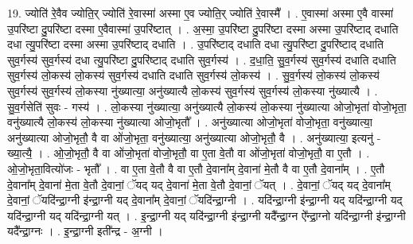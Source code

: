 \documentclass[17pt]{extarticle}
\begin{document}
19. ज्योति॑ रे॒वैव ज्योति॒र् ज्योति॑ रे॒वास्मा॑ अस्मा ए॒व ज्योति॒र् ज्योति॑ रे॒वास्मै᳚ । . ए॒वास्मा॑ अस्मा ए॒वै वास्मा॑ उ॒परि॑ष्टा दु॒परि॑ष्टा दस्मा ए॒वैवास्मा॑ उ॒परि॑ष्टात् । . अ॒स्मा॒ उ॒परि॑ष्टा दु॒परि॑ष्टा दस्मा अस्मा उ॒परि॑ष्टाद् दधाति दधा त्यु॒परि॑ष्टा दस्मा अस्मा उ॒परि॑ष्टाद् दधाति । . उ॒परि॑ष्टाद् दधाति दधा त्यु॒परि॑ष्टा दु॒परि॑ष्टाद् दधाति सुव॒र्गस्य॑ सुव॒र्गस्य॑ दधा त्यु॒परि॑ष्टा दु॒परि॑ष्टाद् दधाति सुव॒र्गस्य॑ । . द॒धा॒ति॒ सु॒व॒र्गस्य॑ सुव॒र्गस्य॑ दधाति दधाति सुव॒र्गस्य॑ लो॒कस्य॑ लो॒कस्य॑ सुव॒र्गस्य॑ दधाति दधाति सुव॒र्गस्य॑ लो॒कस्य॑ । . सु॒व॒र्गस्य॑ लो॒कस्य॑ लो॒कस्य॑ सुव॒र्गस्य॑ सुव॒र्गस्य॑ लो॒कस्या नु॑ख्यात्या॒ अनु॑ख्यात्यै लो॒कस्य॑ सुव॒र्गस्य॑ सुव॒र्गस्य॑ लो॒कस्या नु॑ख्यात्यै । . सु॒व॒र्गसेति॑ सुवः - गस्य॑ । . लो॒कस्या नु॑ख्यात्या॒ अनु॑ख्यात्यै लो॒कस्य॑ लो॒कस्या नु॑ख्यात्या ओजो॒भृता॑ वोजो॒भृता॒ वनु॑ख्यात्यै लो॒कस्य॑ लो॒कस्या नु॑ख्यात्या ओजो॒भृतौ᳚ । . अनु॑ख्यात्या ओजो॒भृता॑ वोजो॒भृता॒ वनु॑ख्यात्या॒ अनु॑ख्यात्या ओजो॒भृतौ॒ वै वा ओ॑जो॒भृता॒ वनु॑ख्यात्या॒ अनु॑ख्यात्या ओजो॒भृतौ॒ वै । . अनु॑ख्यात्या॒ इत्यनु॑ - ख्या॒त्यै॒ । . ओ॒जो॒भृतौ॒ वै वा ओ॑जो॒भृता॑ वोजो॒भृतौ॒ वा ए॒ता वे॒तौ वा ओ॑जो॒भृता॑ वोजो॒भृतौ॒ वा ए॒तौ । . ओ॒जो॒भृता॒वित्यो॑जः - भृतौ᳚ । . वा ए॒ता वे॒तौ वै वा ए॒तौ दे॒वाना᳚म् दे॒वाना॑ मे॒तौ वै वा ए॒तौ दे॒वाना᳚म् । . ए॒तौ दे॒वाना᳚म् दे॒वाना॑ मे॒ता वे॒तौ दे॒वानां॒ ॅयद् यद् दे॒वाना॑ मे॒ता वे॒तौ दे॒वानां॒ ॅयत् । . दे॒वानां॒ ॅयद् यद् दे॒वाना᳚म् दे॒वानां॒ ॅयदि॑न्द्रा॒ग्नी इ॑न्द्रा॒ग्नी यद् दे॒वाना᳚म् दे॒वानां॒ ॅयदि॑न्द्रा॒ग्नी । . यदि॑न्द्रा॒ग्नी इ॑न्द्रा॒ग्नी यद् यदि॑न्द्रा॒ग्नी यद् यदि॑न्द्रा॒ग्नी यद् यदि॑न्द्रा॒ग्नी यत् । . इ॒न्द्रा॒ग्नी यद् यदि॑न्द्रा॒ग्नी इ॑न्द्रा॒ग्नी यदै᳚न्द्रा॒ग्न ऐ᳚न्द्रा॒ग्नो यदि॑न्द्रा॒ग्नी इ॑न्द्रा॒ग्नी यदै᳚न्द्रा॒ग्नः । . इ॒न्द्रा॒ग्नी इती᳚न्द्र - अ॒ग्नी । \newline
\end{document}
